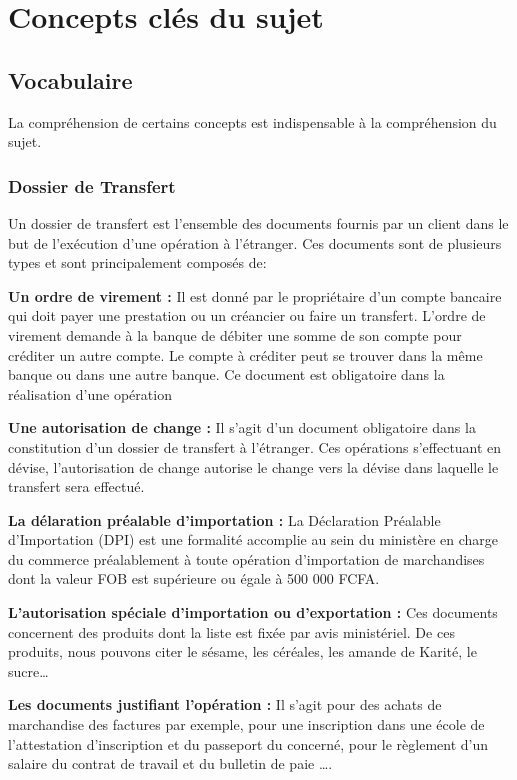 \section{Concepts clés du sujet}

\subsection{Vocabulaire}

La compréhension de certains concepts est indispensable à la compréhension du 
sujet.

\subsubsection{Dossier de Transfert}

Un dossier de transfert est l'ensemble des documents fournis par un client 
dans le but de l'exécution d'une opération à l'étranger. Ces documents sont de 
plusieurs types et sont principalement composés de:

\begin{description}
  \item{\textbf{Un ordre de virement :}} Il est donné par le propriétaire d'un compte
    bancaire qui doit payer une prestation ou un créancier ou faire un 
    transfert. L'ordre de virement demande à la banque de débiter une somme de 
    son compte pour créditer un autre compte. Le compte à créditer peut se 
    trouver dans la même banque ou dans une autre banque. Ce document est
    obligatoire dans la réalisation d'une opération
   
  \item{\textbf{Une autorisation de change :}} Il s'agit d'un document obligatoire dans 
  la constitution d'un dossier de transfert à l'étranger. Ces opérations
    s'effectuant en dévise, l'autorisation de change autorise le change vers la
    dévise dans laquelle le transfert sera effectué.
    
  \item{\textbf{La délaration préalable d'importation :}} La Déclaration Préalable 
    d’Importation (DPI) est une formalité accomplie  au sein du ministère en 
    charge du commerce préalablement à toute opération d’importation de 
    marchandises dont la valeur FOB est supérieure ou égale à 500 000 FCFA.
    
  \item{\textbf{L'autorisation spéciale d'importation ou d'exportation :}} Ces documents 
    concernent des produits dont la liste est fixée par avis ministériel. De ces 
    produits, nous pouvons citer le sésame, les céréales, les amande de Karité,
    le sucre\ldots
 
  \item{\textbf{Les documents justifiant l'opération :}} Il s'agit pour des achats de
    marchandise des factures par exemple, pour une inscription dans une école de
    l'attestation d'inscription et du passeport du concerné, pour le règlement 
    d'un salaire du contrat de travail et du bulletin de paie \ldots. 
\end{description} 
   
